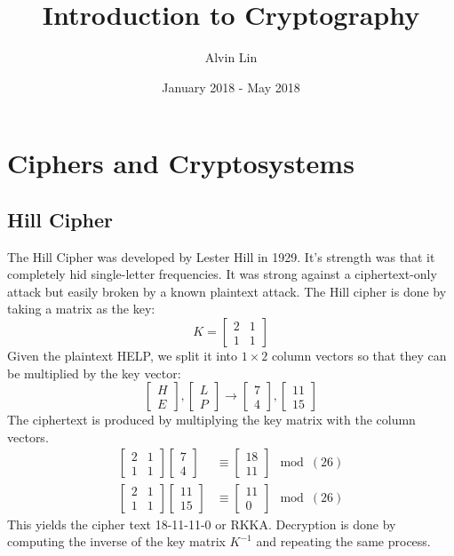 \documentclass{math}
\title{Introduction to Cryptography}
\author{Alvin Lin}
\date{January 2018 - May 2018}
\begin{document}
\maketitle

\section*{Ciphers and Cryptosystems}

\subsection*{Hill Cipher}
The Hill Cipher was developed by Lester Hill in 1929. It's strength was that it
completely hid single-letter frequencies. It was strong against a
ciphertext-only attack but easily broken by a known plaintext attack. The Hill
cipher is done by taking a matrix as the key:
\[ K = \begin{bmatrix}2 & 1 \\ 1 & 1\end{bmatrix} \]
Given the plaintext HELP, we split it into \( 1\times2 \) column vectors so
that they can be multiplied by the key vector:
\[ \begin{bmatrix}H \\ E\end{bmatrix},
  \begin{bmatrix}L \\ P\end{bmatrix}\to
  \begin{bmatrix}7 \\ 4\end{bmatrix},
  \begin{bmatrix}11 \\ 15\end{bmatrix} \]
The ciphertext is produced by multiplying the key matrix with the column
vectors.
\begin{align*}
  \begin{bmatrix}2 & 1 \\ 1 & 1\end{bmatrix}
    \begin{bmatrix}7 \\ 4\end{bmatrix} &\equiv
    \begin{bmatrix}18 \\ 11\end{bmatrix}\mod(26) \\
  \begin{bmatrix}2 & 1 \\ 1 & 1\end{bmatrix}
    \begin{bmatrix}11 \\ 15\end{bmatrix} &\equiv
    \begin{bmatrix}11 \\ 0\end{bmatrix}\mod(26)
\end{align*}
This yields the cipher text 18-11-11-0 or RKKA. Decryption is done by computing
the inverse of the key matrix \( K^{-1} \) and repeating the same process.
\end{document}
